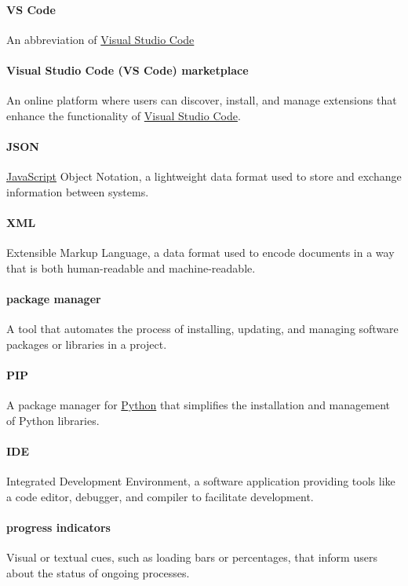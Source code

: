 \documentclass[12pt]{article}
\begin{document}
\paragraph*{VS Code}
An abbreviation of \hyperref[term:VSC]{Visual Studio Code}

\paragraph*{Visual Studio Code (VS Code) marketplace}
An online platform where users can discover, install, and manage extensions that enhance the functionality of \hyperref[term:VSC]{Visual Studio Code}.

\paragraph*{JSON}
\label{term:JSON}
\hyperref[term:JS]{JavaScript} Object Notation, a lightweight data format used to store and exchange information between systems.

\paragraph*{XML}
\label{term:XML}
Extensible Markup Language, a data format used to encode documents in a way that is both human-readable and machine-readable.

\paragraph*{package manager}
A tool that automates the process of installing, updating, and managing software packages or libraries in a project.

\paragraph*{PIP}
A package manager for \hyperref[term:python]{Python} that simplifies the installation and management of Python libraries.

\paragraph*{IDE}
Integrated Development Environment, a software application providing tools like a code editor, debugger, and compiler to facilitate development.

\paragraph*{progress indicators}
Visual or textual cues, such as loading bars or percentages, that inform users about the status of ongoing processes.
\end{document}
